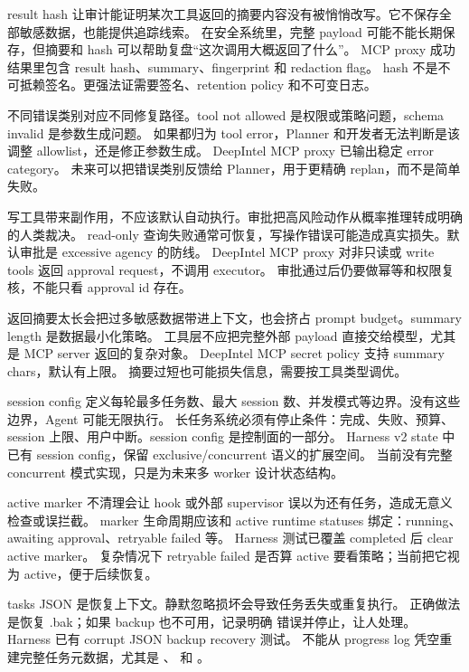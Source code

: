 {result hash 让审计能证明某次工具返回的摘要内容没有被悄悄改写。它不保存全部敏感数据，也能提供追踪线索。}
{在安全系统里，完整 payload 可能不能长期保存，但摘要和 hash 可以帮助复盘“这次调用大概返回了什么”。}
{MCP proxy 成功结果里包含 result hash、summary、fingerprint 和 redaction flag。}
{hash 不是不可抵赖签名。更强法证需要签名、retention policy 和不可变日志。}

{不同错误类别对应不同修复路径。tool not allowed 是权限或策略问题，schema invalid 是参数生成问题。}
{如果都归为 tool error，Planner 和开发者无法判断是该调整 allowlist，还是修正参数生成。}
{DeepIntel MCP proxy 已输出稳定 error category。}
{未来可以把错误类别反馈给 Planner，用于更精确 replan，而不是简单失败。}

{写工具带来副作用，不应该默认自动执行。审批把高风险动作从概率推理转成明确的人类裁决。}
{read-only 查询失败通常可恢复，写操作错误可能造成真实损失。默认审批是 excessive agency 的防线。}
{DeepIntel MCP proxy 对非只读或 write tools 返回 approval request，不调用 executor。}
{审批通过后仍要做幂等和权限复核，不能只看 approval id 存在。}

{返回摘要太长会把过多敏感数据带进上下文，也会挤占 prompt budget。summary length 是数据最小化策略。}
{工具层不应把完整外部 payload 直接交给模型，尤其是 MCP server 返回的复杂对象。}
{DeepIntel MCP secret policy 支持 summary chars，默认有上限。}
{摘要过短也可能损失信息，需要按工具类型调优。}

{session config 定义每轮最多任务数、最大 session 数、并发模式等边界。没有这些边界，Agent 可能无限执行。}
{长任务系统必须有停止条件：完成、失败、预算、session 上限、用户中断。session config 是控制面的一部分。}
{Harness v2 state 中已有 session config，保留 exclusive/concurrent 语义的扩展空间。}
{当前没有完整 concurrent 模式实现，只是为未来多 worker 设计状态结构。}

{active marker 不清理会让 hook 或外部 supervisor 误以为还有任务，造成无意义检查或误拦截。}
{marker 生命周期应该和 active runtime statuses 绑定：running、awaiting approval、retryable failed 等。}
{Harness 测试已覆盖 completed 后 clear active marker。}
{复杂情况下 retryable failed 是否算 active 要看策略；当前把它视为 active，便于后续恢复。}

{tasks JSON 是恢复上下文。静默忽略损坏会导致任务丢失或重复执行。}
{正确做法是恢复 .bak；如果 backup 也不可用，记录明确  错误并停止，让人处理。}
{Harness 已有 corrupt JSON backup recovery 测试。}
{不能从 progress log 凭空重建完整任务元数据，尤其是 、 和 。}

